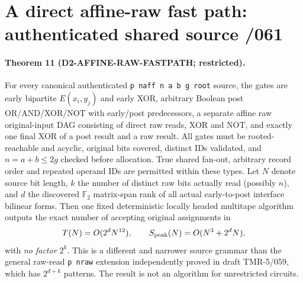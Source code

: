 \documentclass[11pt]{article}
\begin{document}
\section{A direct affine-raw fast path: authenticated shared source /061}
\paragraph{Theorem 11 (D2-AFFINE-RAW-FASTPATH; restricted).}
For every canonical authenticated \texttt{p naff n a b g root} source, the gates are early bipartite $E(x_i,y_j)$ and early XOR, arbitrary Boolean post OR/AND/XOR/NOT with early/post predecessors, a separate affine raw original-input DAG consisting of direct raw reads, XOR and NOT, and exactly one final XOR of a post result and a raw result. All gates must be rooted-reachable and acyclic, original bits covered, distinct IDs validated, and $n=a+b\leq 2g$ checked before allocation. True shared fan-out, arbitrary record order and repeated operand IDs are permitted within these types. Let $N$ denote source bit length, $k$ the number of distinct raw bits actually read (possibly $n$), and $d$ the discovered $\mathbb F_2$ matrix-span rank of all actual early-to-post interface bilinear forms. Then one fixed deterministic locally headed multitape algorithm outputs the exact number of accepting original assignments in
\[
T(N)=O(2^dN^{12}),\qquad S_{\rm peak}(N)=O(N^3+2^dN),
\]
with \emph{no factor $2^k$}. This is a different and narrower source grammar than the general raw-read \texttt{p nraw} extension independently proved in draft TMR-5/059, which has $2^{d+k}$ patterns. The result is not an algorithm for unrestricted circuits.
\end{document}
